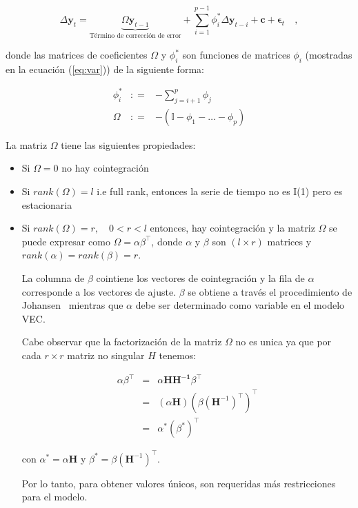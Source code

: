 \begin{equation}
 \label{eq:vec}
  \Delta \mathbf{y}_t = 
   \underbrace{ \Omega\mathbf{y}_{t-1}}_\text{Término de corrección de error} + 
    \sum_{i=1}^{p-1}
    \phi_i^* \Delta \mathbf{y}_{t-i}  + \mathbf{c} + \mathbf{\epsilon}_t \quad ,
    \end{equation}

    \noindent donde las matrices de coeficientes $\Omega$ y $\phi_i^*$ son
    funciones de matrices $\phi_i$ (mostradas en la ecuación (\ref{eq:var})) de
    la siguiente forma:

    \begin{eqnarray*}
    \phi_i^* &: =& -\sum_{j=i+1}^{p} \phi_j \\
    \Omega &: =& -(\mathbb{I}-\phi_1-\dots-\phi_p) 
    \end{eqnarray*}

    La matriz $\Omega$ tiene las siguientes propiedades:
    \begin{itemize}
    \item Si $\Omega = 0$ no hay cointegración 
    \item Si $rank(\Omega)=l$ i.e full rank, entonces la serie de tiempo no es I(1) pero es estacionaria
    \item Si $rank(\Omega)=r,\quad 0 < r < l$ entonces, hay cointegración 
    y la matriz $\Omega$ se puede expresar como $\Omega =
    \alpha \beta^\intercal$, donde $\alpha$ y $\beta$ son $(l \times r)$
    matrices y $rank(\alpha)=rank(\beta)=r$.

    La columna de $\beta$ cointiene los vectores de cointegración y la fila de
    $\alpha$ corresponde a los vectores de ajuste. $\beta$ se obtiene a través
    el procedimiento de Johansen~\cite{johansen1988} mientras que $\alpha$ debe
    ser determinado como variable en el modelo VEC.

    Cabe observar que la factorización de la matriz $\Omega$ no es unica ya que por cada
    $r \times r$ matriz no singular $H$ tenemos:

\begin{eqnarray*}
\alpha \beta^\intercal &=& \alpha \mathbf{HH^{-1}} \beta^\intercal\\
&=&(\alpha\mathbf{H})(\beta(\mathbf{H}^{-1})^\intercal)^\intercal \\
&=& \alpha^*(\beta^*)^\intercal
\end{eqnarray*}

\noindent con $\alpha^* = \alpha\mathbf{H}$ y $\beta^* =
\beta(\mathbf{H}^{-1})^\intercal$.

Por lo tanto, para obtener valores únicos, son requeridas más restricciones
para el modelo.

\end{itemize}

